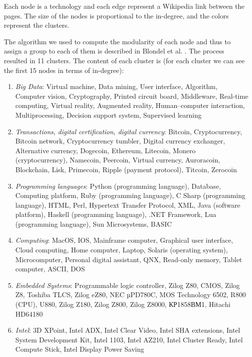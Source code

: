 \documentclass[]{book}
\theoremstyle{definition}
\theoremstyle{definition}
\theoremstyle{definition}
\theoremstyle{remark}
\begin{document}
Each node is a technology and each edge represent a Wikipedia link
between the pages. The size of the nodes is proportional to the
in-degree, and the colors represent the clusters.

The algorithm we used to compute the modularity of each node and thus to
assign a group to each of them is described in Blondel et al.
\citep{blondel2008fast}. The process resulted in 11 clusters. The
content of each cluster is (for each cluster we can see the first 15
nodes in terms of in-degree):

\begin{enumerate}
\def\labelenumi{\arabic{enumi}.}
\item
  \emph{Big Data}: Virtual machine, Data mining, User interface,
  Algorithm, Computer vision, Cryptography, Printed circuit board,
  Middleware, Real-time computing, Virtual reality, Augmented reality,
  Human--computer interaction, Multiprocessing, Decision support system,
  Supervised learning
\item
  \emph{Transactions, digital certification, digital currency}: Bitcoin,
  Cryptocurrency, Bitcoin network, Cryptocurrency tumbler, Digital
  currency exchanger, Alternative currency, Dogecoin, Ethereum,
  Litecoin, Monero (cryptocurrency), Namecoin, Peercoin, Virtual
  currency, Auroracoin, Blockchain, Lisk, Primecoin, Ripple (payment
  protocol), Titcoin, Zerocoin
\item
  \emph{Programming languages}: Python (programming language), Database,
  Computing platform, Ruby (programming language), C Sharp (programming
  language), HTML, Perl, Hypertext Transfer Protocol, XML, Java
  (software platform), Haskell (programming language), .NET Framework,
  Lua (programming language), Sun Microsystems, BASIC
\item
  \emph{Computing}: MacOS, IOS, Mainframe computer, Graphical user
  interface, Cloud computing, Home computer, Laptop, Solaris (operating
  system), Microcomputer, Personal digital assistant, QNX, Read-only
  memory, Tablet computer, ASCII, DOS
\item
  \emph{Embedded Systems}: Programmable logic controller, Zilog Z80,
  CMOS, Zilog Z8, Toshiba TLCS, Zilog eZ80, NEC µPD780C, MOS Technology
  6502, R800 (CPU), U880, Zilog Z180, Zilog Z800, Zilog Z8000,
  КР1858ВМ1, Hitachi HD64180
\item
  \emph{Intel}: 3D XPoint, Intel ADX, Intel Clear Video, Intel SHA
  extensions, Intel System Development Kit, Intel 1103, Intel AZ210,
  Intel Cluster Ready, Intel Compute Stick, Intel Display Power Saving

\end{enumerate}
\end{document}
